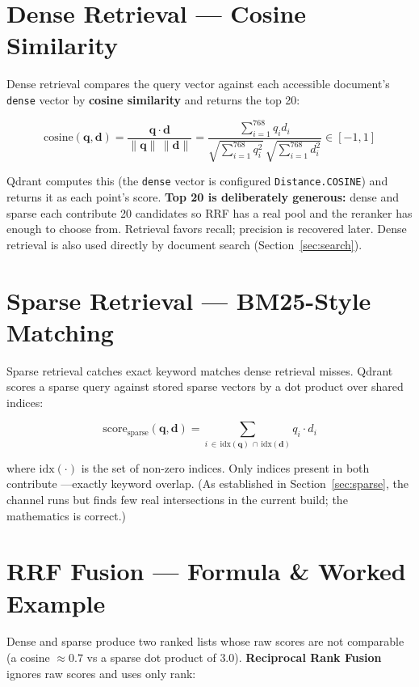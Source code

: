 \documentclass[11pt,a4paper,oneside]{report}
\newcommand{\code}[1]{\texttt{#1}}
\begin{document}
\section{Dense Retrieval --- Cosine Similarity}
Dense retrieval compares the query vector against each accessible document's \code{dense} vector by
\textbf{cosine similarity} and returns the top 20:

\begin{equation}
\mathrm{cosine}(\mathbf{q},\mathbf{d}) = \frac{\mathbf{q}\cdot\mathbf{d}}{\lVert\mathbf{q}\rVert\,\lVert\mathbf{d}\rVert}
= \frac{\sum_{i=1}^{768} q_i d_i}{\sqrt{\sum_{i=1}^{768} q_i^2}\,\sqrt{\sum_{i=1}^{768} d_i^2}} \in [-1,1]
\end{equation}

Qdrant computes this (the \code{dense} vector is configured \code{Distance.COSINE}) and returns it
as each point's score. \textbf{Top 20 is deliberately generous:} dense and sparse each contribute 20
candidates so RRF has a real pool and the reranker has enough to choose from. Retrieval favors
recall; precision is recovered later. Dense retrieval is also used directly by document search
(Section~\ref{sec:search}).

\section{Sparse Retrieval --- BM25-Style Matching}
Sparse retrieval catches exact keyword matches dense retrieval misses. Qdrant scores a sparse query
against stored sparse vectors by a dot product over shared indices:

\begin{equation}
\mathrm{score}_{\text{sparse}}(\mathbf{q},\mathbf{d}) = \sum_{i \,\in\, \mathrm{idx}(\mathbf{q})\,\cap\,\mathrm{idx}(\mathbf{d})} q_i \cdot d_i
\end{equation}

where $\mathrm{idx}(\cdot)$ is the set of non-zero indices. Only indices present in both contribute
---exactly keyword overlap. (As established in Section~\ref{sec:sparse}, the channel runs but finds
few real intersections in the current build; the mathematics is correct.)

\section{RRF Fusion --- Formula \& Worked Example}
Dense and sparse produce two ranked lists whose raw scores are not comparable (a cosine $\approx
0.7$ vs a sparse dot product of $3.0$). \textbf{Reciprocal Rank Fusion} ignores raw scores and uses
only rank:
\end{document}
